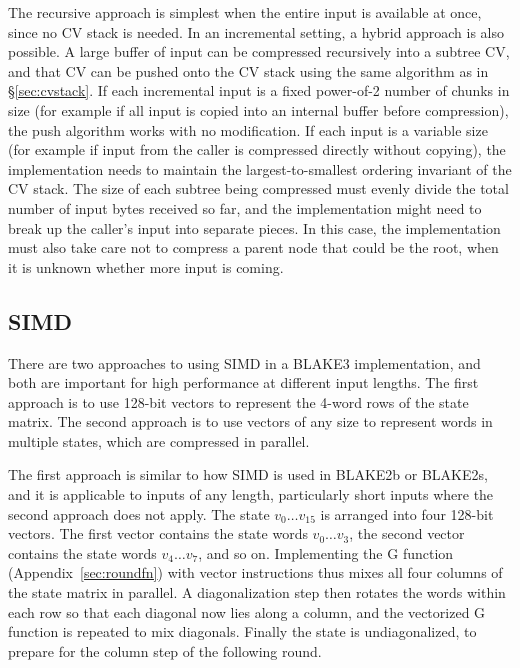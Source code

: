 \documentclass[11pt,notitlepage,a4paper]{article}
\begin{document}
The recursive approach is simplest when the entire input is available at once,
since no CV stack is needed. In an incremental setting, a hybrid approach is
also possible. A large buffer of input can be compressed recursively into a
subtree CV, and that CV can be pushed onto the CV stack using the same
algorithm as in \S\ref{sec:cvstack}. If each incremental input is a fixed
power-of-2 number of chunks in size (for example if all input is copied into an
internal buffer before compression), the push algorithm works with no
modification. If each input is a variable size (for example if input from the
caller is compressed directly without copying), the implementation needs to
maintain the largest-to-smallest ordering invariant of the CV stack. The size
of each subtree being compressed must evenly divide the total number of input
bytes received so far, and the implementation might need to break up the
caller's input into separate pieces. In this case, the implementation must also
take care not to compress a parent node that could be the root, when it is
unknown whether more input is coming.

\subsection{SIMD}\label{sec:simd}

There are two approaches to using SIMD in a BLAKE3 implementation, and both are
important for high performance at different input lengths. The first approach
is to use 128-bit vectors to represent the 4-word rows of the state matrix. The
second approach is to use vectors of any size to represent words in multiple
states, which are compressed in parallel.

The first approach is similar to how SIMD is used in BLAKE2b or BLAKE2s, and it
is applicable to inputs of any length, particularly short inputs where the
second approach does not apply. The state $v_0 \ldots v_{15}$ is arranged into
four 128-bit vectors. The first vector contains the state words $v_0 \ldots
v_3$, the second vector contains the state words $v_4 \ldots v_7$, and so on.
Implementing the G function (Appendix~\ref{sec:roundfn}) with vector
instructions thus mixes all four columns of the state matrix in parallel. A
diagonalization step then rotates the words within each row so that each
diagonal now lies along a column, and the vectorized G function is repeated to
mix diagonals. Finally the state is undiagonalized, to prepare for the column
step of the following round.
\end{document}

